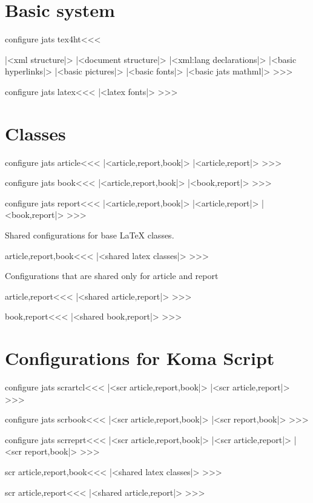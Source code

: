 \section{Basic system}

\<configure jats tex4ht\><<<
|<xml structure|>
|<document structure|>
|<xml:lang declarations|>
|<basic hyperlinks|>
|<basic pictures|>
|<basic fonts|>
|<basic jats mathml|>
>>>

\<configure jats latex\><<<
|<latex fonts|>
>>>



\section{Classes}


\<configure jats article\><<<
|<article,report,book|>
|<article,report|>
>>>

\<configure jats book\><<<
|<article,report,book|>
|<book,report|>
>>>

\<configure jats report\><<<
|<article,report,book|>
|<article,report|>
|<book,report|>
>>>

Shared configurations for base LaTeX classes.

\<article,report,book\><<<
|<shared latex classes|>
>>>

Configurations that are shared only for article and report

\<article,report\><<<
|<shared article,report|>
>>>

\<book,report\><<<
|<shared book,report|>
>>>

\section{Configurations for Koma Script}

\<configure jats scrartcl\><<<
|<scr article,report,book|>
|<scr article,report|>
>>>

\<configure jats scrbook\><<<
|<scr article,report,book|>
|<scr report,book|>
>>>

\<configure jats scrreprt\><<<
|<scr article,report,book|>
|<scr article,report|>
|<scr report,book|>
>>>

\<scr article,report,book\><<<
|<shared latex classes|>
>>>

\<scr article,report\><<<
|<shared article,report|>
>>>

